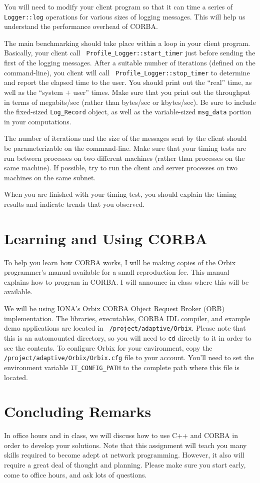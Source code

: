 \noindent You will need to modify your client program so that it can
time a series of {\tt Logger::log} operations for various sizes of
logging messages.  This will help us understand the performance
overhead of CORBA.

The main benchmarking should take place within a loop in your client
program.  Basically, your client call {\tt
Profile\_Logger::start\_timer} just before sending the first of the
logging messages.  After a suitable number of iterations (defined on
the command-line), you client will call {\tt
Profile\_Logger::stop\_timer} to determine and report the elapsed time
to the user.  You should print out the ``real'' time, as well as the
``system $+$ user'' times.  Make sure that you print out the
throughput in terms of megabits/sec (rather than bytes/sec or
kbytes/sec).  Be sure to include the fixed-sized {\tt Log\_Record}
object, as well as the variable-sized {\tt msg\_data} portion in your
computations.

The number of iterations and the size of the messages sent by the
client should be parameterizable on the command-line.  Make sure that
your timing tests are run between processes on two different machines
(rather than processes on the same machine).  If possible, try to run
the client and server processes on two machines on the same subnet.

When you are finished with your timing test, you should explain the
timing results and indicate trends that you observed.

\section{Learning and Using CORBA}

To help you learn how CORBA works, I will be making copies of the
Orbix programmer's manual available for a small reproduction fee.
This manual explains how to program in CORBA.  I will announce in
class where this will be available.

We will be using IONA's Orbix CORBA Object Request Broker (ORB)
implementation.  The libraries, executables, CORBA IDL compiler, and
example demo applications are located in {\tt
/project/adaptive/Orbix}.  Please note that this is an automounted
directory, so you will need to {\tt cd} directly to it in order to see
the contents.  To configure Orbix for your environment, copy the {\tt
/project/adaptive/Orbix/Orbix.cfg} file to your account.  You'll need
to set the environment variable {\tt IT\_CONFIG\_PATH} to the complete
path where this file is located.

\section{Concluding Remarks}
In office hours and in class, we will discuss how to use C++ and CORBA
in order to develop your solutions.  Note that this assignment will
teach you many skills required to become adept at network programming.
However, it also will require a great deal of thought and planning.
Please make sure you start early, come to office hours, and ask lots
of questions.


